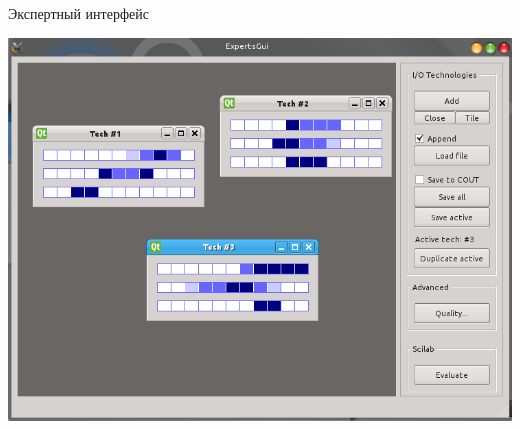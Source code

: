 \begin{frame}{Экспертный интерфейс}
          \begin{center}
	      \includegraphics[width=0.75\linewidth]{./pic/combination6}
	  \end{center}
\end{frame} %
